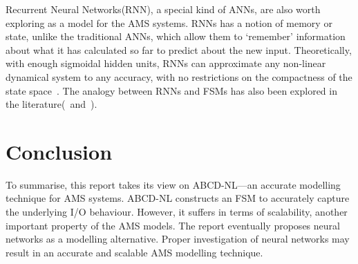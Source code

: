 \documentclass[a4paper]{article}
\begin{document}
Recurrent Neural Networks(RNN), a special kind of ANNs, are also worth exploring as a model for the AMS systems. RNNs has a notion of memory or state,  unlike the traditional ANNs, which allow them to `remember' information about what it has calculated so far to predict about the new input. Theoretically, with enough sigmoidal hidden units, RNNs can approximate any non-linear dynamical system to any accuracy, with no restrictions on the compactness of the state space~\cite{RNN_UNI_APPX}. The analogy between RNNs and FSMs has also been explored in the literature(\cite{RNN_FSM1}~and~\cite{RNN_FSM2}).	



\section{Conclusion}\label{sec:conclusion}
To summarise, this report takes its view on ABCD-NL---an accurate modelling technique for AMS systems. ABCD-NL constructs an FSM to accurately capture the underlying I/O behaviour. However, it suffers in terms of scalability, another important property of the AMS models. The report eventually proposes neural networks as a modelling alternative. Proper investigation of neural networks may result in an accurate and scalable AMS modelling technique.  





 

\end{document}
